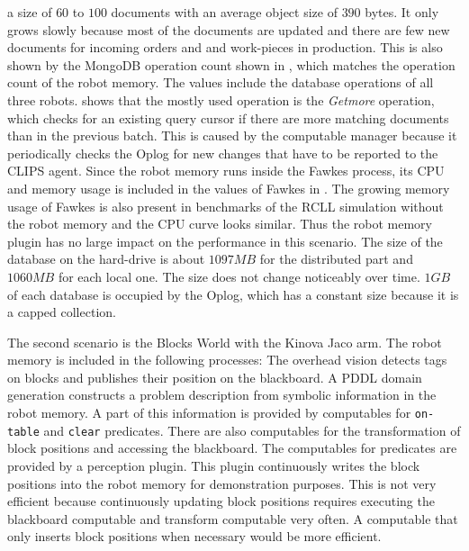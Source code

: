 a size of $60$ to $100$ documents with an average object size of $390$
bytes. It only grows slowly because most of the documents are updated
and there are few new documents for incoming orders and and work-pieces
in production. This is also shown by the MongoDB operation count shown
in , which matches the operation count of
the robot memory. The values include the database operations of
all three robots.  shows that the mostly
used operation is the \emph{Getmore} operation, which checks for an
existing query cursor if there are more matching documents than in the
previous batch. This is caused by the computable manager because it
periodically checks the Oplog for new changes that have to be reported
to the CLIPS agent. Since the robot memory runs inside the Fawkes
process, its CPU and memory usage is included in the values of Fawkes
in . The growing memory usage of Fawkes is
also present in benchmarks of the RCLL simulation without the robot
memory and the CPU curve looks similar. Thus the robot memory plugin
has no large impact on the performance in this scenario. 
The size of the database on the hard-drive is about $1097MB$ for the
distributed part and $1060MB$ for each local one. The size does not
change noticeably over time. $1GB$ of each database is occupied by the
Oplog, which has a constant size because it is a capped collection.




The second scenario is the Blocks World with the Kinova Jaco arm. The
robot memory is included in the following processes: The overhead
vision detects tags on blocks and publishes their position on the
blackboard. A PDDL domain generation constructs a problem description
from symbolic information in the robot memory. A part of this
information is provided by computables for \texttt{on-table} and
\texttt{clear} predicates. There are also computables for the
transformation of block positions and accessing the blackboard. The
computables for predicates are provided by a perception plugin. This
plugin continuously writes the block positions into the robot memory
for demonstration purposes. This is not very efficient because
continuously updating block positions requires executing the
blackboard computable and transform computable very often. A
computable that only inserts block positions when necessary would be
more efficient.


